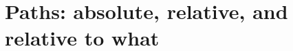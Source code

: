 \chapter{Paths: absolute, relative, and relative to what}
\label{ch:paths-absolute-relative-and-relative-to}

